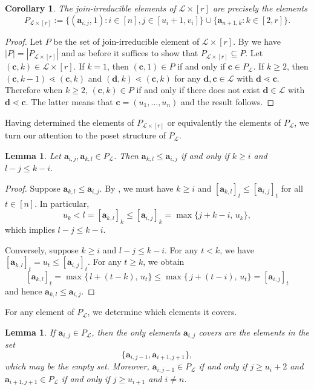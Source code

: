 \documentclass[11pt,a4paper,reqno,dvipsnames]{amsart}
\theoremstyle{plain}
\newtheorem{Lemma}[Theorem]{Lemma}
\newtheorem{Corollary}[Theorem]{Corollary}
\theoremstyle{definition}
\newtheorem{Assumptions and Discussion}[Theorem]{Assumptions and Discussion}
\theoremstyle{remark}
\newcommand\bda{{\bm a}}
\newcommand\bdc{{\bm c}}
\newcommand\bdd{{\bm d}}
\newcommand\calL{\mathcal{L}}
\newcommand{\Lr}{\ensuremath{\calL\times[r]}}
\begin{document}
\begin{Corollary}\label{cor: join irr}
    The join-irreducible elements of $\calL\times [r]$ are precisely the elements \[ P_{\Lr} := \{(\bda_{i,j},1): i\in[n], j\in[u_i+1, v_i]\}\cup \{\bda_{n+1,k}: k\in [2,r]\}.\]
\end{Corollary}
   \begin{proof}
        Let $P$ be the set of join-irreducible element of $\Lr$. By \cite[Corollary~4.24]{CFGLLLM} we have $|P|=|P_{\Lr}|$ and as before it suffices to show that $P_{\Lr}\subseteq P$. Let $(\bdc,k)\in \Lr$. If $k=1$, then $(\bdc,1)\in P$ if and only if $\bdc\in P_{\calL}$. If $k\ge 2$, then $(\bdc,k-1)\lessdot (\bdc,k)$ and $(\bdd, k)\lessdot (\bdc,k)$ for any  $\bdd,\bdc\in \calL$ with $\bdd\lessdot \bdc$. Therefore when $k\ge 2$, $(\bdc, k)\in P$ if and only if there does not exist $\bdd\in \calL$ with $\bdd \lessdot \bdc$. The latter means that $\bdc=(u_1, \ldots, u_n)$ and the result follows. 
       \end{proof}

 

Having determined the elements of $P_{\Lr}$ or equivalently the elements of $P_\calL$, we turn our attention to the poset structure of $P_{\calL}$.



\begin{Lemma} \label{cor: north east}
       Let $\bda_{i,j}, \bda_{k,l}\in P_{\calL}$. Then $\bda_{k,l}\le \bda_{i,j}$ if and only if $k\ge i$ and $l-j\le k-i$.
\end{Lemma} 
\begin{proof}
    Suppose $\bda_{k,l} \le \bda_{i,j}$. By , we must have $k \ge i$
and $[\bda_{k,l}]_t \le [\bda_{i,j}]_t$ for all $t \in [n]$. 
In particular,
\[
u_k < l = [\bda_{k,l}]_k \le [\bda_{i,j}]_k = \max\{j + k-i,\, u_k\},
\]
which implies $l-j\le k-i$.

    Conversely, suppose $k \ge i$ and $l-j\le k-i$.  
For any $t < k$, we have 
$[\bda_{k,l}]_t = u_t \le [\bda_{i,j}]_t$.
For any $t \ge k$, we obtain
\[
[\bda_{k,l}]_t = \max\{\,l + (t-k),\, u_t\} \le  \max\{\,j + (t-i),\, u_t\} = [\bda_{i,j}]_t\]
and hence $\bda_{k,l} \le \bda_{i,j}$.
\end{proof}


For any element of $P_{\calL}$, we determine  which elements it covers. 


\begin{Lemma} \label{lem: coverinP}
If $\bda_{i,j}\in P_{\calL}$, then the only elements $\bda_{i,j}$ covers are the elements in the set $$ \{\bda_{i,j-1}, \bda_{i+1,j+1}\},$$ which may be the empty set.
Moreover, 
$\bda_{i,j-1} \in P_{\calL} $ if and only if $ j \ge u_i+2$ and $\bda_{i+1, j+1} \in P_{\calL} $ if and only if $j \ge u_{i+1}$ and $i\neq n$.  
\end{Lemma}
\end{document}
